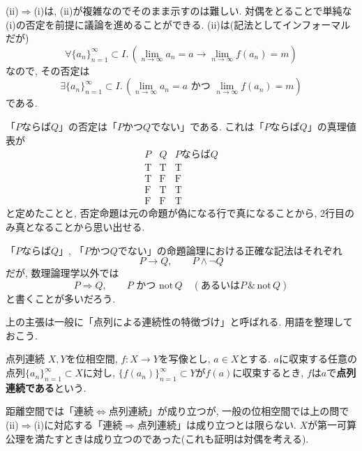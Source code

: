 \documentclass[titlepage]{jsarticle}
\numberwithin{equation}{section}
\begin{document}
\begin{marker}
(ii)$\Rightarrow$(i)は, (ii)が複雑なのでそのまま示すのは難しい. 対偶をとることで単純な(i)の否定を前提に議論を進めることができる. (ii)は(記法としてインフォーマルだが)
\[
\forall \{a_n\}_{n =1}^\infty \subset I.\,\left(\lim_{n \to \infty} a_n = a \to \lim_{n \to \infty} f(a_n) = m \right) 
\]
なので, その否定は
\[
\exists \{a_n\}_{n =1}^\infty \subset I.\,\left(\lim_{n \to \infty} a_n = a\,\,\text{かつ}\,\, \lim_{n \to \infty} f(a_n) = m\right)
\]
である.
\end{marker}
\begin{marker}
「$P$ならば$Q$」の否定は「$P$かつ$Q$でない」である. これは「$P$ならば$Q$」の真理値表が
\[
\begin{array}{c|c|c}
P & Q & P \text{ならば} Q \\ \hline
\mathrm{T} & \mathrm{T} & \mathrm{T} \\
\mathrm{T} & \mathrm{F} & \mathrm{F} \\
\mathrm{F} & \mathrm{T} & \mathrm{T} \\
\mathrm{F} & \mathrm{F} & \mathrm{T}
\end{array}
\]
と定めたことと, 否定命題は元の命題が偽になる行で真になることから, 2行目のみ真となることから思い出せる.
\end{marker}
\begin{marker}
「$P$ならば$Q$」, 「$P$かつ$Q$でない」の命題論理における正確な記法はそれぞれ
\[
P \to Q,\qquad P \land \neg Q
\]
だが, 数理論理学以外では
\[
P \Rightarrow Q, \qquad P\,\,\text{かつ}\,\,\text{not}\,Q\quad(\text{あるいは} P\,\&\,\text{not}\,Q)
\]
と書くことが多いだろう. 
\end{marker}
上の主張は一般に「点列による連続性の特徴づけ」と呼ばれる. 用語を整理しておこう. 
\begin{dfn}{点列連続}{}
$X, Y$を位相空間, $f : X \to Y$を写像とし, $a \in X$とする. $a$に収束する任意の点列$\{a_n\}_{n=1}^{\infty} \subset X$に対し, $\{f(a_n)\}_{n =1}^\infty \subset Y$が$f(a)$に収束するとき, $f$は$a$で\textbf{点列連続である}という.
\end{dfn}
距離空間では「連続$\Leftrightarrow$点列連続」が成り立つが, 一般の位相空間では上の問で(ii)$\Rightarrow$(i)に対応する「連続$\Rightarrow$点列連続」は成り立つとは限らない. $X$が第一可算公理を満たすときは成り立つのであった(これも証明は対偶を考える).
\end{document}
